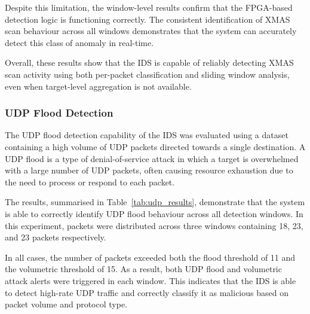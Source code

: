 Despite this limitation, the window-level results confirm that the FPGA-based
detection logic is functioning correctly. The consistent identification of XMAS
scan behaviour across all windows demonstrates that the system can accurately
detect this class of anomaly in real-time.

Overall, these results show that the IDS is capable of reliably detecting XMAS
scan activity using both per-packet classification and sliding window
analysis, even when target-level aggregation is not available.


\subsubsection{UDP Flood Detection}

\begin{table}[H]
    \centering
    \caption{UDP flood detection results}
    \label{tab:udp_results}
\end{table}

The UDP flood detection capability of the IDS was evaluated using a dataset
containing a high volume of UDP packets directed towards a single destination.
A UDP flood is a type of denial-of-service attack in which a target is
overwhelmed with a large number of UDP packets, often causing resource
exhaustion due to the need to process or respond to each packet.

The results, summarised in Table~\ref{tab:udp_results}, demonstrate that the
system is able to correctly identify UDP flood behaviour across all detection
windows. In this experiment, packets were distributed across three windows
containing 18, 23, and 23 packets respectively.

In all cases, the number of packets exceeded both the flood threshold of 11 and
the volumetric threshold of 15. As a result, both UDP flood and volumetric
attack alerts were triggered in each window. This indicates that the IDS is
able to detect high-rate UDP traffic and correctly classify it as malicious
based on packet volume and protocol type.

